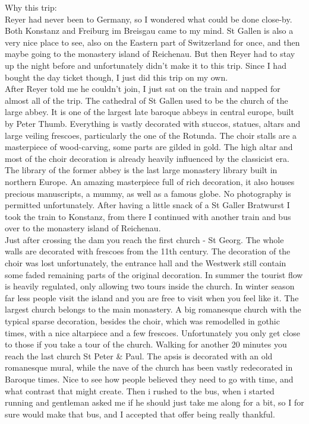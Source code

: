Why this trip:\\
Reyer had never been to Germany, so I wondered what could be done close-by. Both Konstanz and Freiburg im Breisgau came to my mind. St Gallen is also a very nice place to see, also on the Eastern part of Switzerland for once, and then maybe going to the monastery island of Reichenau. But then Reyer had to stay up the night before and unfortunately didn't make it to this trip. Since I had bought the day ticket though, I just did this trip on my own.\\

After Reyer told me he couldn't join, I just sat on the train and napped for almost all of the trip. The cathedral of St Gallen used to be the church of the large abbey. It is one of the largest late baroque abbeys in central europe, built by Peter Thumb. Everything is vastly decorated with stuccos, statues, altars and large veiling frescoes, particularly the one of the Rotunda. The choir stalls are a masterpiece of wood-carving, some parts are gilded in gold. The high altar and most of the choir decoration is already heavily influenced by the classicist era. The library of the former abbey is the last large monastery library built in northern Europe. An amazing masterpiece full of rich decoration, it also houses precious manuscripts, a mummy, as well as a famous globe. No photography is permitted unfortunately. After having a little snack of a St Galler Bratwurst I took the train to Konstanz, from there I continued with another train and bus over to the monastery island of Reichenau. \\
Just after crossing the dam you reach the first church - St Georg. The whole walls are decorated with frescoes from the 11th century. The decoration of the choir was lost unfortunately, the entrance hall and the Westwerk still contain some faded remaining parts of the original decoration. In summer the tourist flow is heavily regulated, only allowing two tours inside the church. In winter season far less people visit the island and you are free to visit when you feel like it. The largest church belongs to the main monastery. A big romanesque church with the typical sparse decoration, besides the choir, which was remodelled in gothic times, with a nice altarpiece and a few frescoes. Unfortunately you only get close to those if you take a tour of the church. Walking for another 20 minutes you reach the last church St Peter \& Paul. The apsis is decorated with an old romanesque mural, while the nave of the church has been vastly redecorated in Baroque times. Nice to see how people believed they need to go with time, and what contrast that might create. Then i rushed to the bus, when i started running and gentleman asked me if he should just take me along for a bit, so I for sure would make that bus, and I accepted that offer being really thankful.\\
